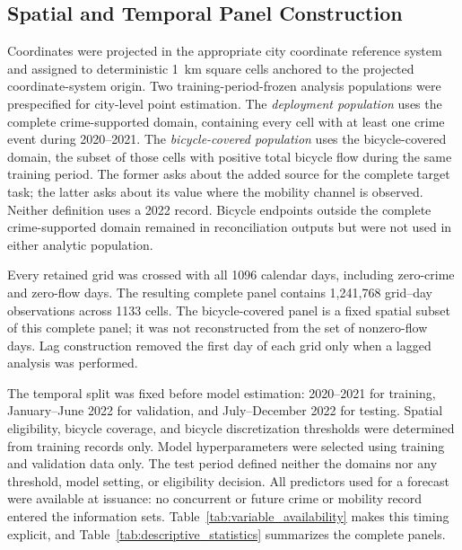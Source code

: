 \documentclass[applsci,article,accept,moreauthors]{Definitions/mdpi}
\def\hl#1{#1}%
\newcommand{\TotalPanelRows}{1,241,768}
\begin{document}
\subsection{Spatial and Temporal Panel Construction}
\label{subsec:panel_construction}

Coordinates were projected in the appropriate city coordinate reference
system and assigned to deterministic 1~km square cells anchored to the
projected coordinate-system origin. Two training-period-frozen analysis
populations were prespecified for city-level point estimation. The
\emph{\hl{deployment population}} uses the complete
crime-supported domain, containing every cell with at least one crime event
during 2020--2021. The \emph{\hl{bicycle-covered population}} uses the
bicycle-covered domain, the subset of those cells with positive total
bicycle flow during the same training period. The former asks about the
added source for the complete target task; the latter asks about its value
where the mobility channel is observed. Neither definition uses a 2022
record. Bicycle endpoints outside the complete crime-supported domain
remained in reconciliation outputs but were not used in either analytic
population.

Every retained grid was crossed with all 1096 calendar days, including
zero-crime and zero-flow days. The resulting complete panel contains
\TotalPanelRows{} grid--day observations across 1133 cells. The
bicycle-covered panel is a fixed spatial subset of this complete panel; it
was not reconstructed from the set of nonzero-flow days. Lag construction
removed the first day of each grid only when a lagged analysis was
performed.

The temporal split was fixed before model estimation: 2020--2021 for
training, January--June 2022 for validation, and July--December 2022 for
testing. Spatial eligibility, bicycle coverage, and bicycle discretization
thresholds were determined from training records only. Model
hyperparameters were selected using training and validation data only.
The test period defined neither the domains nor any threshold, model
setting, or eligibility decision. All predictors used for a forecast were
available at issuance: no concurrent or future crime or mobility record
entered the information sets. Table~\ref{tab:variable_availability} makes
this timing explicit, and Table~\ref{tab:descriptive_statistics} summarizes
the complete panels.
\end{document}
